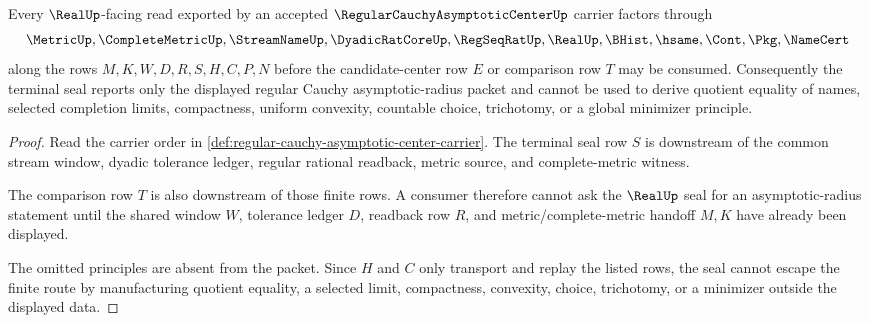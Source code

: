 \begin{theorem}
\label{thm:regular-cauchy-asymptotic-center-real-seal}
Every $\RealUp$-facing read exported by an accepted $\RegularCauchyAsymptoticCenterUp$ carrier factors through
$$
\MetricUp,\CompleteMetricUp,\StreamNameUp,\DyadicRatCoreUp,\RegSeqRatUp,\RealUp,\BHist,\hsame,\Cont,\Pkg,\NameCert
$$
along the rows $M,K,W,D,R,S,H,C,P,N$ before the candidate-center row $E$ or comparison row $T$ may be consumed. Consequently the terminal seal reports only the displayed regular Cauchy asymptotic-radius packet and cannot be used to derive quotient equality of names, selected completion limits, compactness, uniform convexity, countable choice, trichotomy, or a global minimizer principle.
\end{theorem}
\begin{proof}
Read the carrier order in \autoref{def:regular-cauchy-asymptotic-center-carrier}. The terminal seal row $S$ is downstream of the common stream window, dyadic tolerance ledger, regular rational readback, metric source, and complete-metric witness.

The comparison row $T$ is also downstream of those finite rows. A consumer therefore cannot ask the $\RealUp$ seal for an asymptotic-radius statement until the shared window $W$, tolerance ledger $D$, readback row $R$, and metric/complete-metric handoff $M,K$ have already been displayed.

The omitted principles are absent from the packet. Since $H$ and $C$ only transport and replay the listed rows, the seal cannot escape the finite route by manufacturing quotient equality, a selected limit, compactness, convexity, choice, trichotomy, or a minimizer outside the displayed data.
\end{proof}

